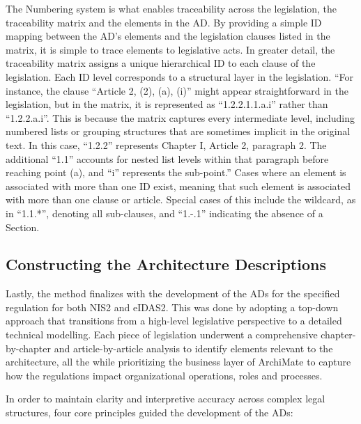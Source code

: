 The Numbering system is what enables traceability across the legislation, the traceability matrix and the elements in the \ac{AD}. By providing a simple \ac{ID} mapping between the \ac{AD}'s elements and the legislation clauses listed in the matrix, it is simple to trace elements to legislative acts. 
In greater detail, the traceability matrix assigns a unique hierarchical \ac{ID} to each clause of the legislation. Each \ac{ID} level corresponds to a structural layer in the legislation.
``For instance, the clause ``Article 2, (2), (a), (i)'' might appear straightforward in the legislation, but in the matrix, it is represented as ``1.2.2.1.1.a.i'' rather than ``1.2.2.a.i''. This is because the matrix captures every intermediate level, including numbered lists or grouping structures that are sometimes implicit in the original text. In this case, ``1.2.2'' represents Chapter I, Article 2, paragraph 2. The additional ``1.1'' accounts for nested list levels within that paragraph before reaching point (a), and ``i'' represents the sub-point.''\cite{Pbol}
Cases where an element is associated with more than one \ac{ID} exist, meaning that such element is associated with more than one clause or article. Special cases of this include the wildcard, as in ``1.1.*'', denoting all sub-clauses, and ``1.-.1'' indicating the absence of a Section.

\subsection{Constructing the Architecture Descriptions}

Lastly, the method finalizes with the development of the \ac{AD}s for the specified regulation for both \ac{NIS2} and \ac{eIDAS2}. This was done by adopting a top-down approach that transitions from a high-level legislative perspective to a detailed technical modelling. Each piece of legislation underwent a comprehensive chapter-by-chapter and article-by-article analysis to identify elements relevant to the architecture, all the while prioritizing the business layer of ArchiMate to capture how the regulations impact organizational operations, roles and processes.

In order to maintain clarity and interpretive accuracy across complex legal structures, four core principles guided the development of the \ac{AD}s:

